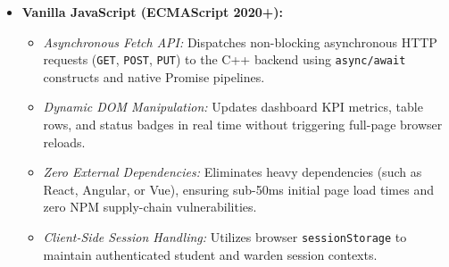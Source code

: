 \documentclass[12pt,a4paper]{article}
\begin{document}
\begin{itemize}
\begin{itemize}
    \end{itemize}
    \item \textbf{Vanilla JavaScript (ECMAScript 2020+):}
    \begin{itemize}
        \item \textit{Asynchronous Fetch API:} Dispatches non-blocking asynchronous HTTP requests (\texttt{GET}, \texttt{POST}, \texttt{PUT}) to the C++ backend using \texttt{async/await} constructs and native Promise pipelines.
        \item \textit{Dynamic DOM Manipulation:} Updates dashboard KPI metrics, table rows, and status badges in real time without triggering full-page browser reloads.
        \item \textit{Zero External Dependencies:} Eliminates heavy dependencies (such as React, Angular, or Vue), ensuring sub-50ms initial page load times and zero NPM supply-chain vulnerabilities.
        \item \textit{Client-Side Session Handling:} Utilizes browser \texttt{sessionStorage} to maintain authenticated student and warden session contexts.
    \end{itemize}
\end{itemize}
\end{document}
